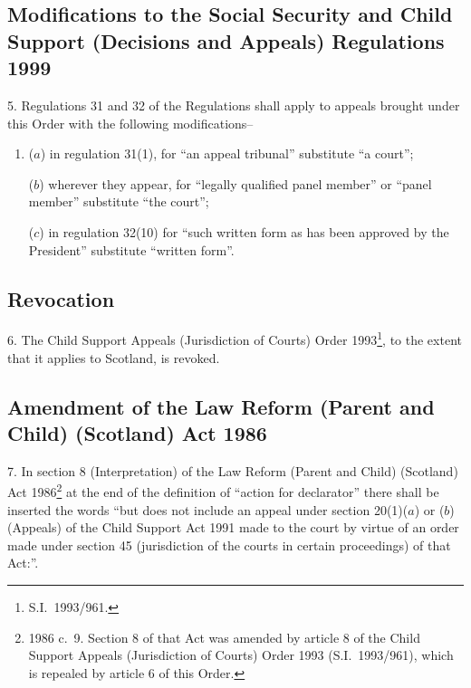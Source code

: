 \documentclass[12pt,a4paper]{article}
\begin{document}
\subsection[5. Modifications to the Social Security and Child Support (Decisions and Appeals) Regulations 1999]{Modifications to the Social Security and Child Support (Decisions and Appeals) Regulations 1999}

5.  Regulations 31 and 32 of the Regulations shall apply to appeals brought under this Order with the following modifications–
\begin{enumerate}\item[]
($a$) in regulation 31(1), for “an appeal tribunal” substitute “a court”;

($b$) wherever they appear, for “legally qualified panel member” or “panel member” substitute “the court”;

($c$) in regulation 32(10) for “such written form as has been approved by the President” substitute “written form”.
\end{enumerate}

\subsection[6. Revocation]{Revocation}

6.  The Child Support Appeals (Jurisdiction of Courts) Order 1993\footnote{S.I.\ 1993/961.}, to the extent that it applies to Scotland, is revoked.

\subsection[7. Amendment of the Law Reform (Parent and Child) (Scotland) Act 1986]{Amendment of the Law Reform (Parent and Child) (Scotland) Act 1986}

7.  In section 8 (Interpretation) of the Law Reform (Parent and Child) (Scotland) Act 1986\footnote{1986 c.\ 9. Section 8 of that Act was amended by article 8 of the Child Support Appeals (Jurisdiction of Courts) Order 1993 (S.I.\ 1993/961), which is repealed by article 6 of this Order.} at the end of the definition of “action for declarator” there shall be inserted the words “but does not include an appeal under section 20(1)($a$)  or ($b$)  (Appeals) of the Child Support Act 1991 made to the court by virtue of an order made under section 45 (jurisdiction of the courts in certain proceedings) of that Act:”. 

\bigskip
\end{document}

